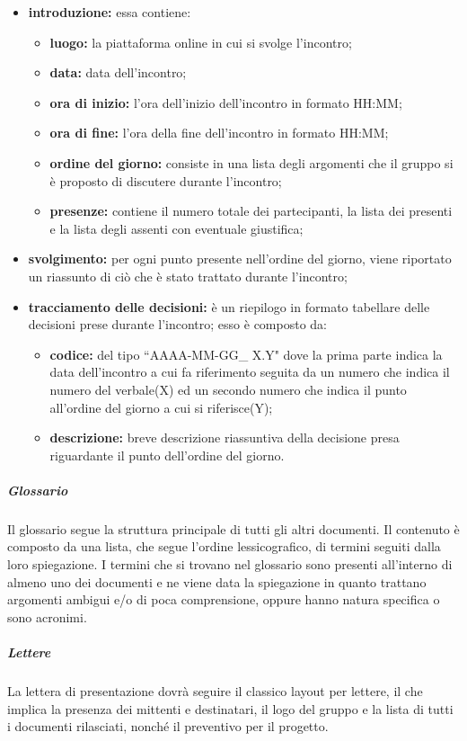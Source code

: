 				\begin{itemize}
						\item \textbf{introduzione:} essa contiene:
							\begin{itemize}
								\item \textbf{luogo:} la piattaforma online in cui si svolge l'incontro;
								\item \textbf{data:} data dell'incontro;
								\item \textbf{ora di inizio:} l'ora dell'inizio dell'incontro in formato HH:MM;
								\item \textbf{ora di fine:} l'ora della fine dell'incontro in formato HH:MM;
								\item \textbf{ordine del giorno:} consiste in una lista degli argomenti che il gruppo si è proposto di discutere durante l'incontro;
								\item \textbf{presenze:} contiene il numero totale dei partecipanti, la lista dei presenti e la lista degli assenti con eventuale giustifica;
							\end{itemize}
							\item \textbf{svolgimento:} per ogni punto presente nell'ordine del giorno, viene riportato un riassunto di ciò che è stato trattato durante l'incontro;
							\item \textbf{tracciamento delle decisioni:} è un riepilogo in formato tabellare delle decisioni prese durante l'incontro; esso è composto da:
							\begin{itemize}
								\item \textbf{codice:} del tipo ``AAAA-MM-GG\_ X.Y" dove la prima parte indica la data dell'incontro a cui fa riferimento seguita da un numero che indica il numero del verbale(X) ed un secondo numero che indica il punto all'ordine del giorno a cui si riferisce(Y);
								\item \textbf{descrizione:} breve descrizione riassuntiva della decisione presa riguardante il punto dell'ordine del giorno.
							\end{itemize}
					\end{itemize}
				\subparagraph{Glossario}
				Il glossario segue la struttura principale di tutti gli altri documenti. Il contenuto è composto da una lista, che segue l'ordine lessicografico, di termini seguiti dalla loro spiegazione. I termini che si trovano nel glossario sono presenti all'interno di almeno uno dei documenti e ne viene data la spiegazione in quanto trattano argomenti ambigui e/o di poca comprensione, oppure hanno natura specifica o sono acronimi. 
				\subparagraph{Lettere}
				La lettera di presentazione dovrà seguire il classico layout per lettere, il che implica la presenza dei mittenti e destinatari, il logo del gruppo e la lista di tutti i documenti rilasciati, nonché il preventivo per il progetto.
